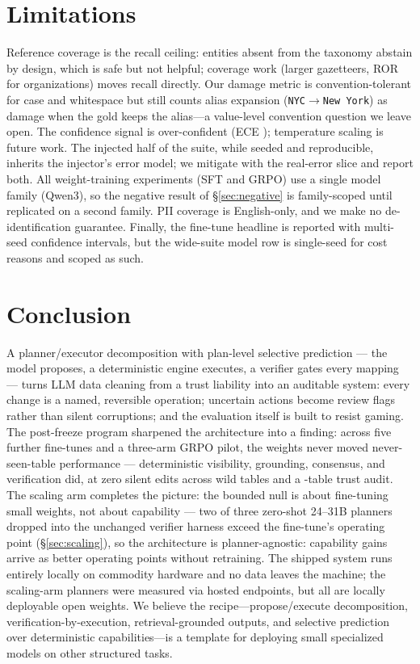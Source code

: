 \documentclass[11pt]{article}
\begin{document}
\section{Limitations}
Reference coverage is the recall ceiling: entities absent from the taxonomy abstain by
design, which is safe but not helpful; coverage work (larger gazetteers, ROR for
organizations) moves recall directly. Our damage metric is convention-tolerant for case
and whitespace but still counts alias expansion (\texttt{NYC}$\to$\texttt{New York}) as
damage when the gold keeps the alias---a value-level convention question we leave open.
The confidence signal is over-confident (ECE \ece); temperature scaling is future
work. The injected half of the suite, while seeded and reproducible, inherits the
injector's error model; we mitigate with the real-error slice and report both. All
weight-training experiments (SFT and GRPO) use a single model family (Qwen3), so
the negative result of \S\ref{sec:negative} is family-scoped until replicated on a
second family. PII
coverage is English-only, and we make no de-identification guarantee. Finally, the
fine-tune headline is reported with multi-seed confidence intervals, but the wide-suite
model row is single-seed for cost reasons and scoped as such.

\section{Conclusion}
A planner/executor decomposition with plan-level selective prediction --- the model
proposes, a deterministic engine executes, a verifier gates every mapping --- turns
LLM data cleaning from a trust liability into an auditable system: every change is a
named, reversible operation; uncertain actions become review flags rather than silent
corruptions; and the evaluation itself is built to resist gaming. The post-freeze
program sharpened the architecture into a finding: across
five further fine-tunes and a three-arm GRPO pilot, the weights never moved
never-seen-table performance --- deterministic visibility, grounding, consensus, and
verification did, at zero silent edits across \nWild{} wild tables and a
\nTrust{}-table trust audit. The scaling arm completes the picture: the bounded null
is about fine-tuning small weights, not about capability --- two of three zero-shot
24--31B planners dropped into the unchanged verifier harness exceed the
fine-tune's operating point (\S\ref{sec:scaling}), so the architecture is
planner-agnostic: capability gains arrive as better operating points without
retraining. The shipped system runs
entirely locally on commodity hardware and no data leaves the machine; the
scaling-arm planners were measured via hosted endpoints, but all are locally
deployable open weights. We believe the recipe---propose/execute decomposition,
verification-by-execution, retrieval-grounded outputs, and selective prediction over
deterministic capabilities---is a template for deploying small specialized models on
other structured tasks.
\end{document}
